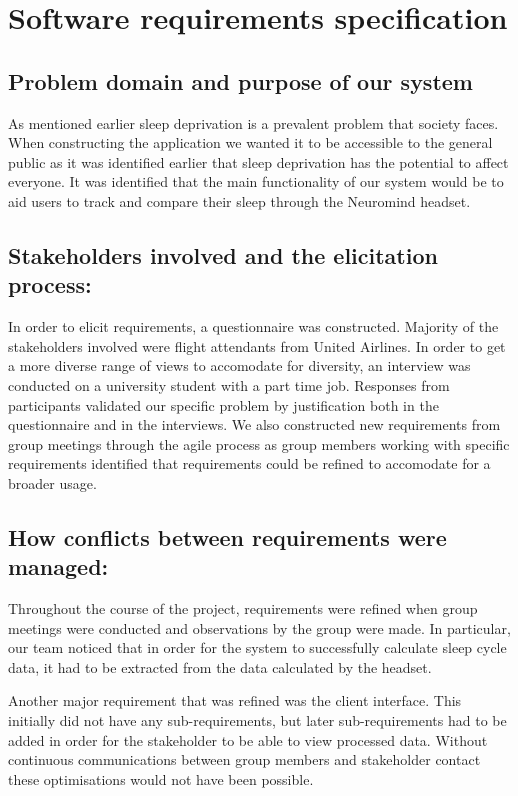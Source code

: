 \section{Software requirements specification}\label{sec:srs}

\subsection{Problem domain and purpose of our system}\label{ssec:intro}
As mentioned earlier sleep deprivation is a prevalent problem that society faces.
When constructing the application we wanted it to be accessible to the general public as it was identified earlier that sleep deprivation has the potential to affect everyone.
It was identified that the main functionality of our system would be to aid users to track and compare their sleep through the Neuromind headset.

\subsection{Stakeholders involved and the elicitation process:}\label{ssec:stakeholders}
In order to elicit requirements, a questionnaire was constructed. Majority of the stakeholders involved were flight attendants from United Airlines.
In order to get a more diverse range of views to accomodate for diversity, an interview was conducted on a university student with a part time job.
Responses from participants validated our specific problem by justification both in the questionnaire and in the interviews.
We also constructed new requirements from group meetings through the agile process as group members working with specific requirements
identified that requirements could be refined to accomodate for a broader usage.

\subsection{How conflicts between requirements were managed:}\label{ssec:conflicts}
Throughout the course of the project, requirements were refined when group
meetings were conducted and observations by the group were made.
In particular, our team noticed that in order for the system to successfully calculate sleep cycle data,
it had to be extracted from the data calculated by the headset.

Another major requirement that was refined was the client interface.
This initially did not have any sub-requirements, but later sub-requirements had to be added in order for the stakeholder to be able to view processed data.
Without continuous communications between group members and stakeholder contact these optimisations would not have been possible.

